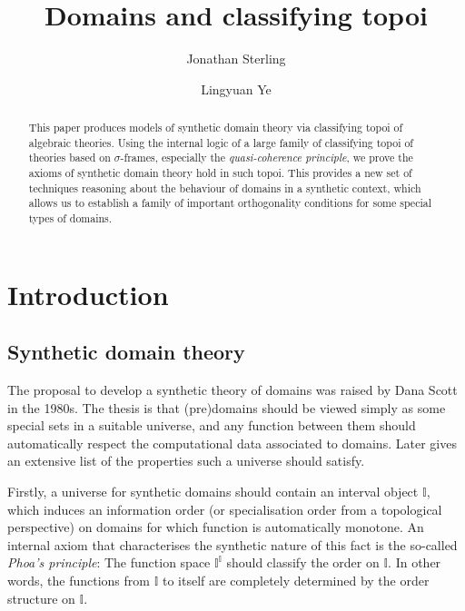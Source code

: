 \documentclass[a4paper,12pt]{amsart}
\title{Domains and classifying topoi}
\author{Jonathan Sterling}
\author{Lingyuan Ye}
\theoremstyle{definition}
\newcommand{\mbb}[1]{\mathbb{#1}}
\newcommand{\I}{\mbb I}
\begin{document}
%

%
%

%
%
\begin{abstract}
  This paper produces models of synthetic domain theory via classifying topoi of algebraic theories. Using the internal logic of a large family of classifying topoi of theories based on $\sigma$-frames, especially the \emph{quasi-coherence principle}, we prove the axioms of synthetic domain theory hold in such topoi. This provides a new set of techniques reasoning about the behaviour of domains in a synthetic context, which allows us to establish a family of important orthogonality conditions for some special types of domains.
\end{abstract}
%
\maketitle              %
%


\section{Introduction}\label{sec:intro}

\subsection{Synthetic domain theory}\label{subsec:sdt}

The proposal to develop a synthetic theory of domains was raised by Dana Scott in the 1980s. The thesis is that (pre)domains should be viewed simply as some special sets in a suitable universe, and any function between them should automatically respect the computational data associated to domains. Later \citet{hyland1990first} gives an extensive list of the properties such a universe should satisfy.

Firstly, a universe for synthetic domains should contain an interval object $\I$, which induces an information order (or specialisation order from a topological perspective) on domains for which function is automatically monotone. An internal axiom that characterises the synthetic nature of this fact is the so-called \emph{Phoa's principle}: The function space $\I^\I$ should classify the order on $\I$. In other words, the functions from $\I$ to itself are completely determined by the order structure on $\I$. 
\end{document}

